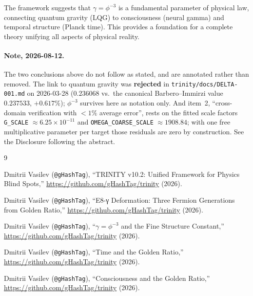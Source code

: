 \documentclass[12pt,a4paper]{article}
\begin{document}
The framework suggests that $\gamma = \phi^{-3}$ is a fundamental parameter of physical law, connecting quantum gravity (LQG) to consciousness (neural gamma) and temporal structure (Planck time). This provides a foundation for a complete theory unifying all aspects of physical reality.

\paragraph{Note, 2026-08-12.} The two conclusions above do not follow as stated, and are annotated rather than removed. The link to quantum gravity was \textbf{rejected} in \texttt{trinity/docs/DELTA-001.md} on 2026-03-28 ($0.236068$ vs.\ the canonical Barbero--Immirzi value $0.237533$, $+0.617\%$); $\phi^{-3}$ survives here as notation only. And item~2, ``cross-domain verification with $<1\%$ average error'', rests on the fitted scale factors \texttt{G\_SCALE} $\approx 6.25\times10^{-11}$ and \texttt{OMEGA\_COARSE\_SCALE} $\approx 1908.84$; with one free multiplicative parameter per target those residuals are zero by construction. See the Disclosure following the abstract.

\begin{thebibliography}{9}

Dmitrii Vasilev (\texttt{@gHashTag}),
``TRINITY v10.2: Unified Framework for Physics Blind Spots,''
\url{https://github.com/gHashTag/trinity} (2026).

Dmitrii Vasilev (\texttt{@gHashTag}),
``E8-γ Deformation: Three Fermion Generations from Golden Ratio,''
\url{https://github.com/gHashTag/trinity} (2026).

Dmitrii Vasilev (\texttt{@gHashTag}),
``$\gamma = \phi^{-3}$ and the Fine Structure Constant,''
\url{https://github.com/gHashTag/trinity} (2026).

Dmitrii Vasilev (\texttt{@gHashTag}),
``Time and the Golden Ratio,''
\url{https://github.com/gHashTag/trinity} (2026).

Dmitrii Vasilev (\texttt{@gHashTag}),
``Consciousness and the Golden Ratio,''
\url{https://github.com/gHashTag/trinity} (2026).

\end{thebibliography}
\end{document}
